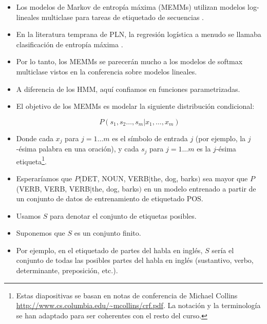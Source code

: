 \begin{itemize}

\item Los modelos de Markov de entropía máxima (MEMMs) utilizan modelos log-lineales multiclase para tareas de etiquetado de secuencias \cite{mccallum2000maximum}.

\item En la literatura temprana de PLN, la regresión logística a menudo se llamaba clasificación de entropía máxima \cite{jacobbook}.

\item Por lo tanto, los MEMMs se parecerán mucho a los modelos de softmax multiclase vistos en la conferencia sobre modelos lineales.

\item A diferencia de los HMM, aquí confiamos en funciones parametrizadas.

\item El objetivo de los MEMMs es modelar la siguiente distribución condicional:

\begin{displaymath}
P(s_1,s_2 \dots, s_m | x_1, \dots, x_m)
\end{displaymath}

\item Donde cada $x_j$ para $j = 1 \dots m$ es el símbolo de entrada $j$ (por ejemplo, la $j$-ésima palabra en una oración), y cada $s_j$ para $j = 1 \dots m$ es la $j$-ésima etiqueta\footnote{Estas diapositivas se basan en notas de conferencia de Michael Collins \url{http://www.cs.columbia.edu/~mcollins/crf.pdf}. La notación y la terminología se han adaptado para ser coherentes con el resto del curso.}.

\item Esperaríamos que $P$(DET, NOUN, VERB$|$the, dog, barks$)$ sea mayor que $P$(VERB, VERB, VERB$|$the, dog, barks$)$ en un modelo entrenado a partir de un conjunto de datos de entrenamiento de etiquetado POS.

\item Usamos $S$ para denotar el conjunto de etiquetas posibles.

\item Suponemos que $S$ es un conjunto finito.

\item Por ejemplo, en el etiquetado de partes del habla en inglés, $S$ sería el conjunto de todas las posibles partes del habla en inglés (sustantivo, verbo, determinante, preposición, etc.).


\end{itemize}
